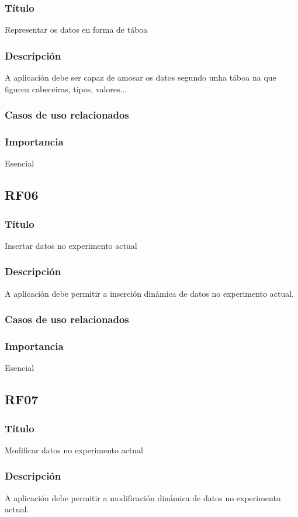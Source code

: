 \subsubsection{Título}
Representar os datos en forma de táboa
\subsubsection{Descripción}
A aplicación debe ser capaz de amosar os datos segundo unha táboa na que figuren cabeceiras, tipos, valores...
\subsubsection{Casos de uso relacionados}
\subsubsection{Importancia}
Esencial

\subsection{RF06}
\subsubsection{Título}
Insertar datos no experimento actual
\subsubsection{Descripción}
A aplicación debe permitir a inserción dinámica de datos no experimento actual.
\subsubsection{Casos de uso relacionados}
\subsubsection{Importancia}
Esencial

\subsection{RF07}
\subsubsection{Título}
Modificar datos no experimento actual
\subsubsection{Descripción}
A aplicación debe permitir a modificación dinámica de datos no experimento actual.
